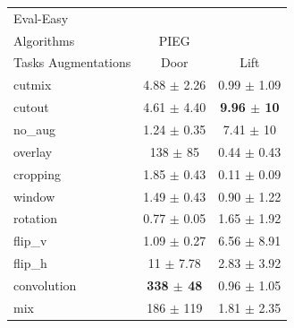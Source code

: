 \begin{tabular}{lcc}
Eval-Easy & & \\
Algorithms & PIEG & \\
Tasks Augmentations & Door & Lift \\
cutmix          & 4.88 $\pm$ 2.26 & 0.99 $\pm$ 1.09 \\
cutout          & 4.61 $\pm$ 4.40 & \textbf{9.96 $\pm$ 10} \\
no\_aug         & 1.24 $\pm$ 0.35 & 7.41 $\pm$ 10 \\
overlay         & 138 $\pm$ 85 & 0.44 $\pm$ 0.43 \\
cropping        & 1.85 $\pm$ 0.43 & 0.11 $\pm$ 0.09 \\
window          & 1.49 $\pm$ 0.43 & 0.90 $\pm$ 1.22 \\
rotation        & 0.77 $\pm$ 0.05 & 1.65 $\pm$ 1.92 \\
flip\_v         & 1.09 $\pm$ 0.27 & 6.56 $\pm$ 8.91 \\
flip\_h         & 11 $\pm$ 7.78 & 2.83 $\pm$ 3.92 \\
convolution     & \textbf{338 $\pm$ 48} & 0.96 $\pm$ 1.05 \\
mix             & 186 $\pm$ 119 & 1.81 $\pm$ 2.35 \\
\end{tabular}